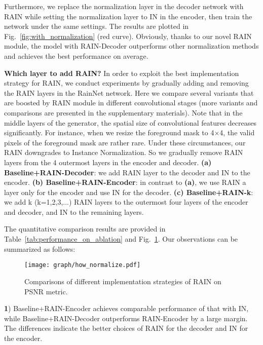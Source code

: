 \documentclass[final]{cvpr}
\begin{document}
Furthermore, we replace the normalization layer in the decoder network with RAIN while setting the normalization layer to IN in the encoder, then train the network under the same settings. The results are plotted in Fig.~\ref{fig:with_normalization} (red curve). Obviously, thanks to our novel RAIN module, the model with RAIN-Decoder outperforms other normalization methods and achieves the best performance on average. 



\noindent
\textbf{Which layer to add RAIN?} In order to exploit the best implementation strategy for RAIN, we conduct experiments by gradually adding and removing the RAIN layers in the RainNet network. Here we compare several variants that are boosted by RAIN module in different convolutional stages (more variants and comparisons are presented in the supplementary materials). Note that in the middle layers of the generator, the spatial size of convolutional features decreases significantly. For instance, when we resize the foreground mask to 4$\times$4, the valid pixels of the foreground mask are rather rare. Under these circumstances, our RAIN downgrades to Instance Normalization. So we gradually remove RAIN layers from the 4 outermost layers in the encoder and decoder. \textbf{(a) Baseline+RAIN-Decoder}: we add RAIN layer to the decoder and IN to the encoder. \textbf{(b) Baseline+RAIN-Encoder}: in contrast to \textbf{(a)}, we use RAIN a layer only for the encoder and use IN for the decoder. \textbf{(c) Baseline+RAIN-k}: we add k (k=1,2,3,...) RAIN layers to the outermost four layers of the encoder and decoder, and IN to the remaining layers. 

The quantitative comparison results are provided in Table~\ref{tab:performance_on_ablation} and Fig.~\ref{fig:how_normalize}. Our observations can be summarized as follows: 

\begin{figure}
\begin{center}
\texttt{[image: graph/how\_normalize.pdf]}
\end{center}
   \caption{Comparisons of different implementation strategies of RAIN on PSNR metric. }
   \label{fig:how_normalize}
\end{figure}

\noindent
\textbf{1}) Baseline+RAIN-Encoder achieves comparable performance of that with IN, while Baseline+RAIN-Decoder outperforms RAIN-Encoder by a large margin. The differences indicate the better choices of RAIN for the decoder and IN for the encoder. 
\end{document}
